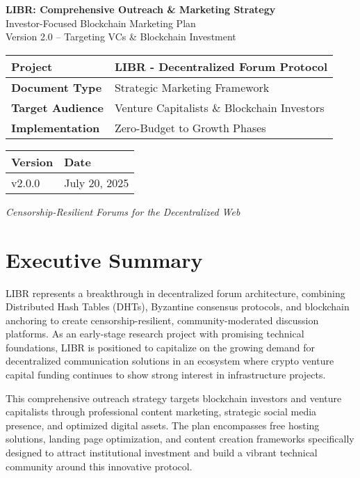 \documentclass[12pt,a4paper]{article}
\begin{document}
\begin{titlepage}
\centering
\vspace*{2cm}
{\Huge\textbf{LIBR: Comprehensive Outreach \& Marketing Strategy}}\\[0.5cm]
{\Large Investor-Focused Blockchain Marketing Plan}\\[1cm]
{\large Version 2.0 -- Targeting VCs \& Blockchain Investment}\\[2cm]

\begin{tabular}{|l|l|}
\hline
\textbf{Project} & LIBR - Decentralized Forum Protocol \\
\hline
\textbf{Document Type} & Strategic Marketing Framework \\
\hline
\textbf{Target Audience} & Venture Capitalists \& Blockchain Investors \\
\hline
\textbf{Implementation} & Zero-Budget to Growth Phases \\
\hline
\end{tabular}

\vspace{10mm}

\begin{tabular}{|l|l|}
\hline
\textbf{Version} & \textbf{Date} \\
\hline
v2.0.0 & July 20, 2025 \\
\hline
\end{tabular}

\vfill
{\large\textit{Censorship-Resilient Forums for the Decentralized Web}}
\end{titlepage}

\tableofcontents
\newpage

\section{Executive Summary}

LIBR represents a breakthrough in decentralized forum architecture, combining Distributed Hash Tables (DHTs), Byzantine consensus protocols, and blockchain anchoring to create censorship-resilient, community-moderated discussion platforms. As an early-stage research project with promising technical foundations, LIBR is positioned to capitalize on the growing demand for decentralized communication solutions in an ecosystem where crypto venture capital funding continues to show strong interest in infrastructure projects.

This comprehensive outreach strategy targets blockchain investors and venture capitalists through professional content marketing, strategic social media presence, and optimized digital assets. The plan encompasses free hosting solutions, landing page optimization, and content creation frameworks specifically designed to attract institutional investment and build a vibrant technical community around this innovative protocol.
\end{document}
